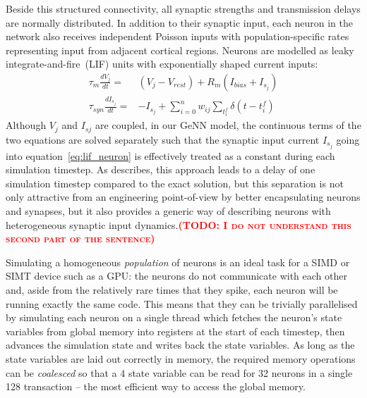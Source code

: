 \documentclass[utf8]{frontiersSCNS} %
\newcommand{\todo}[1]{\textbf{\textsc{\textcolor{red}{(TODO: #1)}}}}
\begin{document}
Beside this structured connectivity, all synaptic strengths and transmission delays are normally distributed.
In addition to their synaptic input, each neuron in the network also receives independent Poisson inputs with population-specific rates representing input from adjacent cortical regions.
Neurons are modelled as leaky integrate-and-fire~(LIF) units with exponentially shaped current inputs:
%
\begin{align}
    \tau_{m} \frac{dV_{j}}{dt} = & (V_{j} - V_{rest}) + R_{m}(I_{bias} + I_{s_{j}}) \label{eq:lif_neuron}\\
    \tau_{syn} \frac{dI_{s_{j}}}{dt} = & -I_{s_{j}} + \sum_{i=0}^{n} w_{ij} \sum_{t_{i}^{f}}  \delta(t - t_{i}^{f})\label{eq:exp_neuron_input_current}
\end{align}
%
Although $V_{j}$ and $I_{s{j}}$ are coupled, in our GeNN model, the continuous terms of the two equations are solved separately such that the synaptic input current $I_{s_{j}}$ going into equation~\ref{eq:lif_neuron} is effectively treated as a constant during each simulation timestep.
As \citet{Rotter1999} describes, this approach leads to a delay of one simulation timestep compared to the exact solution, but this separation is not only attractive from an engineering point-of-view by better encapsulating neurons and synapses, but it also provides a generic way of describing neurons with heterogeneous synaptic input dynamics.\todo{I do not understand this second part of the sentence}

Simulating a homogeneous \textit{population} of neurons is an ideal task for a SIMD or SIMT device such as a GPU: the neurons do not communicate with each other and, aside from the relatively rare times that they spike, each neuron will be running exactly the same code.
This means that they can be trivially parallelised by simulating each neuron on a single thread which fetches the neuron's state variables from global memory into registers at the start of each timestep, then advances the simulation state and writes back the state variables.
As long as the state variables are laid out correctly in memory, the required memory operations can be \textit{coalesced} so that a \SI{4}{\byte} state variable can be read for \num{32} neurons in a single \SI{128}{\byte} transaction -- the most efficient way to access the global memory.
\end{document}
